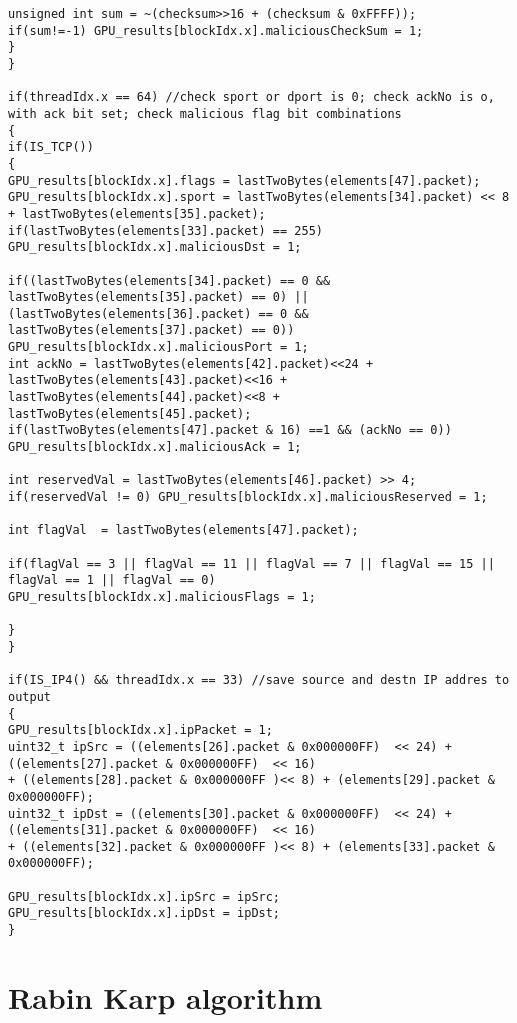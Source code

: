 \begin{lstlisting}
unsigned int sum = ~(checksum>>16 + (checksum & 0xFFFF));
if(sum!=-1) GPU_results[blockIdx.x].maliciousCheckSum = 1;
}
}

if(threadIdx.x == 64) //check sport or dport is 0; check ackNo is o, with ack bit set; check malicious flag bit combinations
{
if(IS_TCP())
{
GPU_results[blockIdx.x].flags = lastTwoBytes(elements[47].packet);
GPU_results[blockIdx.x].sport = lastTwoBytes(elements[34].packet) << 8 + lastTwoBytes(elements[35].packet);
if(lastTwoBytes(elements[33].packet) == 255)
GPU_results[blockIdx.x].maliciousDst = 1;

if((lastTwoBytes(elements[34].packet) == 0 && lastTwoBytes(elements[35].packet) == 0) ||
(lastTwoBytes(elements[36].packet) == 0 && lastTwoBytes(elements[37].packet) == 0))
GPU_results[blockIdx.x].maliciousPort = 1;
int ackNo = lastTwoBytes(elements[42].packet)<<24 + lastTwoBytes(elements[43].packet)<<16 + lastTwoBytes(elements[44].packet)<<8 + lastTwoBytes(elements[45].packet);
if(lastTwoBytes(elements[47].packet & 16) ==1 && (ackNo == 0))
GPU_results[blockIdx.x].maliciousAck = 1;

int reservedVal = lastTwoBytes(elements[46].packet) >> 4;
if(reservedVal != 0) GPU_results[blockIdx.x].maliciousReserved = 1;

int flagVal  = lastTwoBytes(elements[47].packet);

if(flagVal == 3 || flagVal == 11 || flagVal == 7 || flagVal == 15 || flagVal == 1 || flagVal == 0)
GPU_results[blockIdx.x].maliciousFlags = 1;

}
}

if(IS_IP4() && threadIdx.x == 33) //save source and destn IP addres to output
{
GPU_results[blockIdx.x].ipPacket = 1;
uint32_t ipSrc = ((elements[26].packet & 0x000000FF)  << 24) + ((elements[27].packet & 0x000000FF)  << 16)
+ ((elements[28].packet & 0x000000FF )<< 8) + (elements[29].packet & 0x000000FF);
uint32_t ipDst = ((elements[30].packet & 0x000000FF)  << 24) + ((elements[31].packet & 0x000000FF)  << 16)
+ ((elements[32].packet & 0x000000FF )<< 8) + (elements[33].packet & 0x000000FF);

GPU_results[blockIdx.x].ipSrc = ipSrc;
GPU_results[blockIdx.x].ipDst = ipDst;
} 
\end{lstlisting}


\section{Rabin Karp algorithm}
\begin{lstlisting}



\end{lstlisting}

